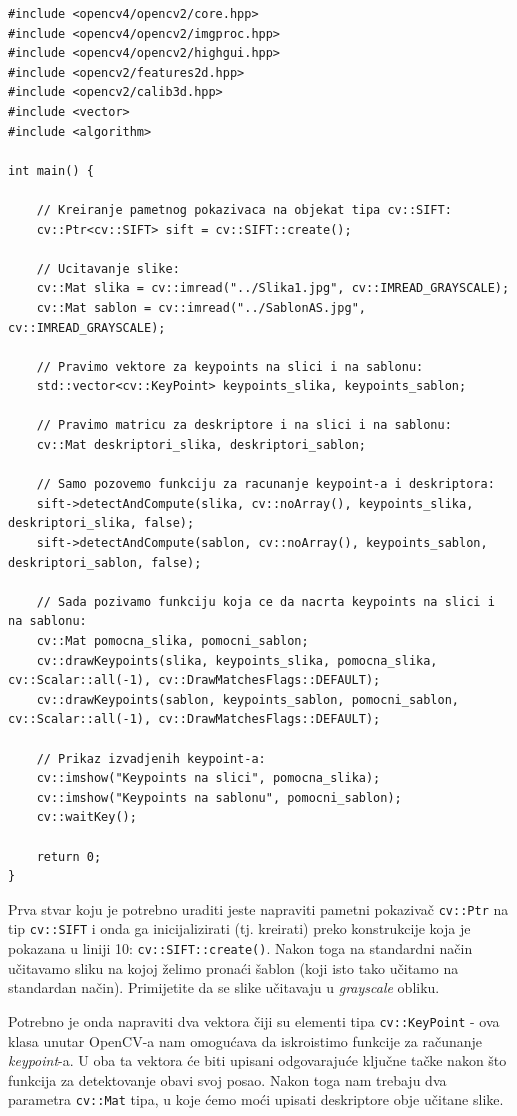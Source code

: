 \documentclass[a4paper, 12pt]{article}
\begin{document}
\begin{lstlisting}
#include <opencv4/opencv2/core.hpp>
#include <opencv4/opencv2/imgproc.hpp>
#include <opencv4/opencv2/highgui.hpp>
#include <opencv2/features2d.hpp>
#include <opencv2/calib3d.hpp>
#include <vector>
#include <algorithm>

int main() {

    // Kreiranje pametnog pokazivaca na objekat tipa cv::SIFT:
    cv::Ptr<cv::SIFT> sift = cv::SIFT::create();

    // Ucitavanje slike:
    cv::Mat slika = cv::imread("../Slika1.jpg", cv::IMREAD_GRAYSCALE);
    cv::Mat sablon = cv::imread("../SablonAS.jpg", cv::IMREAD_GRAYSCALE);

    // Pravimo vektore za keypoints na slici i na sablonu:
    std::vector<cv::KeyPoint> keypoints_slika, keypoints_sablon;

    // Pravimo matricu za deskriptore i na slici i na sablonu:
    cv::Mat deskriptori_slika, deskriptori_sablon;

    // Samo pozovemo funkciju za racunanje keypoint-a i deskriptora:
    sift->detectAndCompute(slika, cv::noArray(), keypoints_slika, deskriptori_slika, false);
    sift->detectAndCompute(sablon, cv::noArray(), keypoints_sablon, deskriptori_sablon, false);

    // Sada pozivamo funkciju koja ce da nacrta keypoints na slici i na sablonu:
    cv::Mat pomocna_slika, pomocni_sablon;
    cv::drawKeypoints(slika, keypoints_slika, pomocna_slika, cv::Scalar::all(-1), cv::DrawMatchesFlags::DEFAULT);
    cv::drawKeypoints(sablon, keypoints_sablon, pomocni_sablon, cv::Scalar::all(-1), cv::DrawMatchesFlags::DEFAULT);

    // Prikaz izvadjenih keypoint-a:
    cv::imshow("Keypoints na slici", pomocna_slika);
    cv::imshow("Keypoints na sablonu", pomocni_sablon);
    cv::waitKey();

    return 0;
}
\end{lstlisting}

Prva stvar koju je potrebno uraditi jeste napraviti pametni pokazivač \lstinline{cv::Ptr} na tip \lstinline{cv::SIFT} i onda ga inicijalizirati (tj. kreirati) preko konstrukcije koja je pokazana u liniji 10: \lstinline{cv::SIFT::create()}. Nakon toga na standardni način učitavamo sliku na kojoj želimo pronaći šablon (koji isto tako učitamo na standardan način). Primijetite da se slike učitavaju u \textit{grayscale} obliku.

Potrebno je onda napraviti dva vektora čiji su elementi tipa \lstinline{cv::KeyPoint} - ova klasa unutar OpenCV-a nam omogućava da iskroistimo funkcije za računanje \textit{keypoint}-a. U oba ta vektora će biti upisani odgovarajuće ključne tačke nakon što funkcija za detektovanje obavi svoj posao. Nakon toga nam trebaju dva parametra \lstinline{cv::Mat} tipa, u koje ćemo moći upisati deskriptore obje učitane slike.
\end{document}
